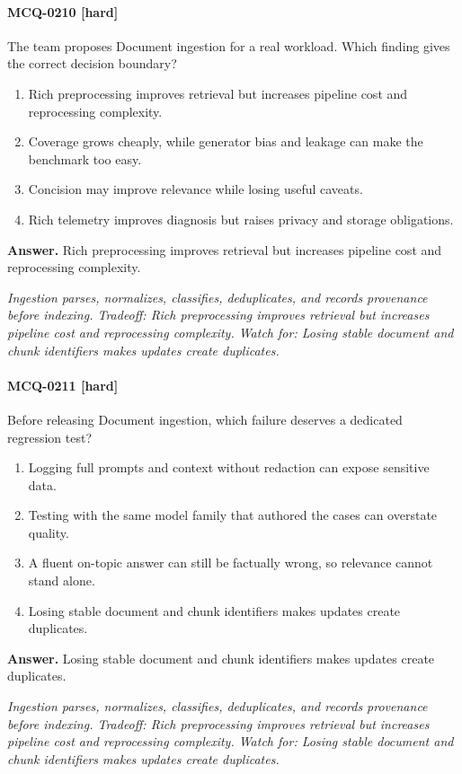 \paragraph{MCQ-0210 [hard]} The team proposes Document ingestion for a real workload. Which finding gives the correct decision boundary?
\begin{enumerate}[label=\Alph*.]
\item Rich preprocessing improves retrieval but increases pipeline cost and reprocessing complexity.
\item Coverage grows cheaply, while generator bias and leakage can make the benchmark too easy.
\item Concision may improve relevance while losing useful caveats.
\item Rich telemetry improves diagnosis but raises privacy and storage obligations.
\end{enumerate}
\noindent\textbf{Answer.} Rich preprocessing improves retrieval but increases pipeline cost and reprocessing complexity.
\par\textit{Ingestion parses, normalizes, classifies, deduplicates, and records provenance before indexing. Tradeoff: Rich preprocessing improves retrieval but increases pipeline cost and reprocessing complexity. Watch for: Losing stable document and chunk identifiers makes updates create duplicates.}
\paragraph{MCQ-0211 [hard]} Before releasing Document ingestion, which failure deserves a dedicated regression test?
\begin{enumerate}[label=\Alph*.]
\item Logging full prompts and context without redaction can expose sensitive data.
\item Testing with the same model family that authored the cases can overstate quality.
\item A fluent on-topic answer can still be factually wrong, so relevance cannot stand alone.
\item Losing stable document and chunk identifiers makes updates create duplicates.
\end{enumerate}
\noindent\textbf{Answer.} Losing stable document and chunk identifiers makes updates create duplicates.
\par\textit{Ingestion parses, normalizes, classifies, deduplicates, and records provenance before indexing. Tradeoff: Rich preprocessing improves retrieval but increases pipeline cost and reprocessing complexity. Watch for: Losing stable document and chunk identifiers makes updates create duplicates.}
